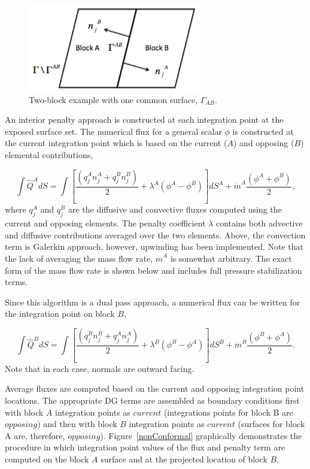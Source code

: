 \begin{figure} 
  \centerline{\includegraphics[height=1.5in]{images/twoBlockDiag.pdf}} 
 \caption{Two-block example with one common surface, $\Gamma_{AB}$.} 
 \label{domainAB} 
\end{figure}    

An interior penalty approach is constructed at each integration point at the 
exposed surface set. The numerical flux for a general scalar $\phi$ is constructed at the 
current integration point which is based on the current ($A$) and opposing ($B$) elemental 
contributions,

\begin{equation} 
        \int \hat Q^A dS = \int [\frac{(q_j^A n_j^A + q_j^B n_j^B)}{2}
				+ \lambda^A ( \phi^A - \phi^B) ]dS^A
        				+ \dot{m}^A \frac{(\phi^A + \phi^B)}{2},
\label{numericalFluxA}
\end{equation}
where $q_j^A$ and $q_j^B$ are the diffusive and convective fluxes computed using the current 
and opposing elements. The penalty coefficient $\lambda$ contains both advective and diffusive 
contributions averaged over the two elements. Above, the convection term is Galerkin approach,
however, upwinding has been implemented. Note that the lack of averaging the mass flow rate, 
$\dot{m}^A$ is somewhat arbitrary. The exact form of the mass flow rate is shown below and includes
full pressure stabilization terms.

Since this algorithm is a dual pass approach, a numerical flux can be written for the integration point on block $B$,

\begin{equation} 
        \int \hat Q^B dS = \int [\frac{(q_j^B n_j^B + q_j^A n_j^A)}{2} 
				+ \lambda^B ( \phi^B - \phi^A) ]dS^B
				+ \dot{m}^B \frac{(\phi^B + \phi^A)}{2}.
\label{numericalFluxB}
\end{equation}
Note that in each case, normals are outward facing. 

Average fluxes are computed based on the current and opposing integration point locations. The 
appropriate DG terms are assembled as boundary conditions first with block $A$ integration 
points as $current$ (integrations points for block B are $opposing$) and then with block $B$ 
integration points as $current$ (surfaces for block A are, therefore, $opposing$). Figure~\ref{nonConformal} 
graphically demonstrates the procedure in which integration point values of the flux and penalty 
term are computed on the block $A$ surface and at the projected location of block $B$. 

